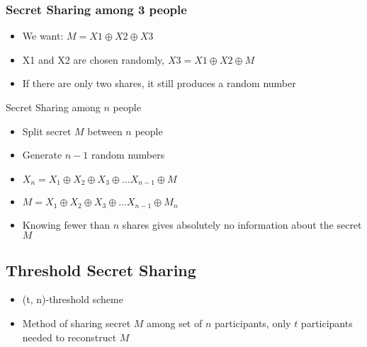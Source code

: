 \subsubsection{Secret Sharing among 3 people}
	\begin{itemize}
		\item We want: $M=X1\oplus X2\oplus X3$
		\item X1 and X2 are chosen randomly, $X3 = X1\oplus X2\oplus M$
		\item If there are only two shares, it still produces a random number
	\end{itemize}
\begin{note}{Secret Sharing among $n$ people}
	\begin{itemize}
		\item Split secret $M$ between $n$ people
		\item Generate $n-1$ random numbers
		\item $X_n = X_1\oplus X_2\oplus X_3\oplus\ldots X_{n-1}\oplus M$
		\item $M = X_1\oplus X_2\oplus X_3\oplus\ldots X_{n-1}\oplus M_n$
		\item Knowing fewer than $n$ shares gives absolutely no information about the secret $M$
	\end{itemize}
\end{note}

\subsection{Threshold Secret Sharing}
\begin{itemize}
	\item (t, n)-threshold scheme
	\item Method of sharing secret $M$ among set of $n$ participants, only $t$ participants needed to reconstruct $M$
\end{itemize}
